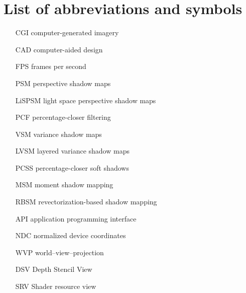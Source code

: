 \chapter{List of abbreviations and symbols}

\begin{itemize}
\item[CGI] computer-generated imagery
\item[CAD] computer-aided design
\item[FPS] frames per second
\item[PSM] perspective shadow maps
\item[LiSPSM] light space perspective shadow maps
\item[PCF] percentage-closer filtering
\item[VSM] variance shadow maps
\item[LVSM] layered variance shadow maps
\item[PCSS] percentage-closer soft shadows
\item[MSM] moment shadow mapping
\item[RBSM] revectorization-based shadow mapping

\item[API] application programming interface
\item[NDC] normalized device coordinates
\item[WVP] world--view--projection
\item[DSV] Depth Stencil View
\item[SRV] Shader resource view

\end{itemize}